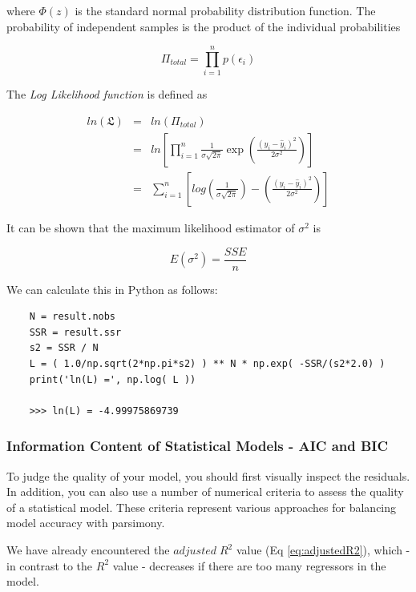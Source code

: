 where $\Phi(z)$ is the standard normal probability distribution function. The probability of independent samples is the product of the individual probabilities

\begin{equation}
  \Pi_{total} = \prod_{i=1}^n p(\epsilon_i)
\end{equation}

The \emph{Log Likelihood function}  is defined as

\begin{eqnarray*}
  ln(\mathfrak{L}) &=& ln(\Pi_{total}) \\
  &=& ln\left[\prod_{i=1}^n \frac{1}{\sigma\sqrt{2 \pi}} \exp \left(\frac{(y_i - \hat{y}_i)^2}{2 \sigma^2}\right)\right] \\
  &=& \sum_{i=1}^n\left[log\left(\frac{1}{\sigma \sqrt{2 \pi}}\right)- \left(\frac{(y_i - \hat{y}_i)^2}{2 \sigma^2}\right)\right]
\end{eqnarray*}

It can be shown that the maximum likelihood estimator of $\sigma^2$ is

\begin{equation}
  E(\sigma^2) = \frac{SSE}{n}
\end{equation}

We can calculate this in Python as follows:

\begin{lstlisting}
    N = result.nobs
    SSR = result.ssr
    s2 = SSR / N
    L = ( 1.0/np.sqrt(2*np.pi*s2) ) ** N * np.exp( -SSR/(s2*2.0) )
    print('ln(L) =', np.log( L ))

    >>> ln(L) = -4.99975869739

\end{lstlisting}


\subsubsection{Information Content of Statistical Models - AIC and BIC}

To judge the quality of your model, you should first visually inspect the residuals. In addition, you can also use a number of numerical criteria to assess the quality of a statistical model. These criteria represent various approaches for balancing model accuracy with parsimony.

We have already encountered the $adjusted\; R^2$ value (Eq \ref{eq:adjustedR2}), which - in contrast to the $R^2$ value - decreases if there are too many regressors in the model.


